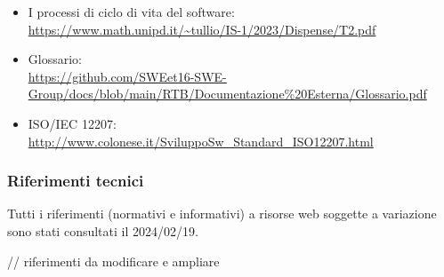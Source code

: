 \begin{itemize}
	\item I processi di ciclo di vita del software: \\
	      \url{https://www.math.unipd.it/~tullio/IS-1/2023/Dispense/T2.pdf}
	\item Glossario: \\
	      \url{https://github.com/SWEet16-SWE-Group/docs/blob/main/RTB/Documentazione%20Esterna/Glossario.pdf}
	\item ISO/IEC 12207: \\
	      \url{http://www.colonese.it/SviluppoSw_Standard_ISO12207.html}
\end{itemize}

\subsubsection{Riferimenti tecnici}

Tutti i riferimenti (normativi e informativi) a risorse web soggette a variazione sono stati consultati il 2024/02/19.


// riferimenti da modificare e ampliare